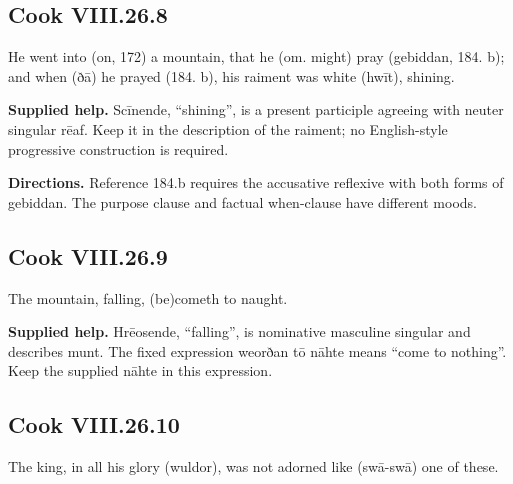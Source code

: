 \par\begin{minipage}{\linewidth}\raggedright
\subsection*{Cook VIII.26.8}

He went into (on, 172) a mountain, that he (om. might) pray (gebiddan, 184. b); and when (ðā) he prayed (184. b), his raiment was white (hwīt), shining.

\end{minipage}\par\addvspace{4pt}

\textbf{Supplied help.} Scīnende, “shining”, is a present participle agreeing with neuter singular rēaf. Keep it in the description of the raiment; no English-style progressive construction is required.

\textbf{Directions.} Reference 184.b requires the accusative reflexive with both forms of gebiddan. The purpose clause and factual when-clause have different moods.

\par\begin{minipage}{\linewidth}\raggedright
\subsection*{Cook VIII.26.9}

The mountain, falling, (be)cometh to naught.

\end{minipage}\par\addvspace{4pt}

\textbf{Supplied help.} Hrēosende, “falling”, is nominative masculine singular and describes munt. The fixed expression weorðan tō nāhte means “come to nothing”. Keep the supplied nāhte in this expression.

\par\begin{minipage}{\linewidth}\raggedright
\subsection*{Cook VIII.26.10}

The king, in all his glory (wuldor), was not adorned like (swā-swā) one of these.

\end{minipage}\par\addvspace{4pt}


